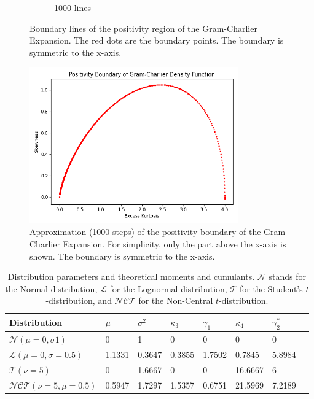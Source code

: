 \begin{figure}
\begin{subfigure}[b]{0.4\textwidth}
        \caption{1000 lines}
    \end{subfigure}
    \caption{Boundary lines of the positivity region of the Gram-Charlier Expansion. The red dots are the boundary points. The boundary is symmetric to the x-axis.}
    \label{fig:gram_charlier_boundary_lines_20_vs_1000}
\end{figure}

\begin{figure}[h]
    \centering
    \includegraphics[width=0.8\textwidth]{img/gc_positivity_boundary.png}
    \caption{Approximation (1000 steps) of the positivity boundary of the Gram-Charlier Expansion. For simplicity, only the part above the x-axis is shown. The boundary is symmetric to the x-axis.}
    \label{fig:gram_charlier_boundary}
\end{figure}

\begin{table}[h]
    \centering
    \begin{tabular}{l|l|l|l|l|l|l|l}
        Distribution & $\mu$ & $\sigma^2$ & $\kappa_3$ & $\gamma_1$ & $\kappa_4$ & $\gamma_2^*$ \\
        \hline
        $\mathcal{N}(\mu=0,\sigma1)$ & 0 & 1 & 0 & 0 & 0 & 0 \\
        $\mathcal{L}(\mu=0, \sigma=0.5)$ & 1.1331 & 0.3647 & 0.3855 & 1.7502 & 0.7845 & 5.8984 \\
        $\mathcal{T}(\nu=5)$ & 0 & 1.6667 & 0 & 0 & 16.6667 & 6 \\
        $\mathcal{NCT}(\nu=5, \mu=0.5)$ & 0.5947 & 1.7297 & 1.5357 & 0.6751 & 21.5969 & 7.2189
    \end{tabular}
    \caption{Distribution parameters and theoretical moments and cumulants. $\mathcal{N}$ stands for the Normal distribution, $\mathcal{L}$ for the Lognormal distribution, $\mathcal{T}$ for the Student's $t$-distribution, and $\mathcal{NCT}$ for the Non-Central $t$-distribution.}
    \label{table:distributions_theoretical_moments}
\end{table}

